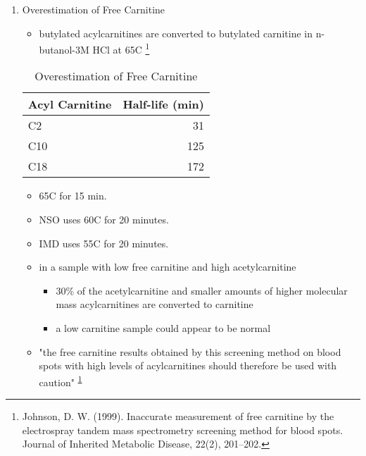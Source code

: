 \documentclass{scrartcl}
\begin{document}
\begin{enumerate}
\begin{center}
\end{center}


\item Overestimation of Free Carnitine
\label{sec:orgbe10b0a}
\begin{itemize}
\item butylated acylcarnitines are converted to butylated carnitine in
n-butanol-3M HCl at 65\degree{}C \footnote{Johnson, D. W. (1999). Inaccurate measurement of free
carnitine by the electrospray tandem mass spectrometry screening
method for blood spots. Journal of Inherited Metabolic Disease, 22(2),
201–202.\label{org7cb4fc3}}
\end{itemize}

\begin{table}[htbp]
\caption{\label{tab:orgd0b5959}Overestimation of Free Carnitine}
\centering
\begin{tabular}{lr}
Acyl Carnitine & Half-life (min)\\
\hline
C2 & 31\\
C10 & 125\\
C18 & 172\\
\end{tabular}
\end{table}

\begin{itemize}
\item 65\degree{}C for 15 min.
\item NSO uses 60\degree{}C for 20 minutes.
\item IMD uses 55\degree{}C for 20 minutes.

\item in a sample with low free carnitine and high acetylcarnitine
\begin{itemize}
\item 30\% of the acetylcarnitine and smaller amounts of higher
molecular mass acylcarnitines are converted to carnitine
\item a low carnitine sample could appear to be normal
\end{itemize}
\item "the free carnitine results obtained by this screening method on
blood spots with high levels of acylcarnitines should therefore be
used with caution" \textsuperscript{\ref{org7cb4fc3}}
\end{itemize}
\end{enumerate}
\end{document}
